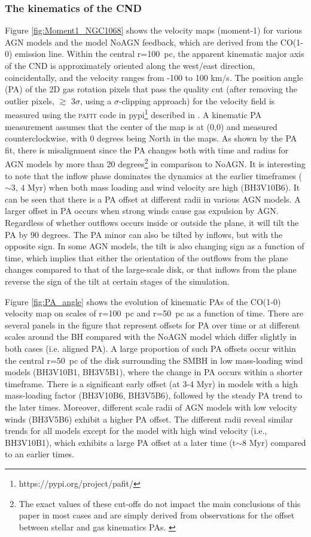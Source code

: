 \documentclass[fleqn,usenatbib]{mnras}
\begin{document}
\subsubsection{The kinematics of the CND}
Figure \ref{fig:Moment1_NGC1068} shows the velocity maps (moment-1) for various AGN models and the model NoAGN feedback, which are derived from the CO(1-0) emission line. 
Within the central r=100~pc, the apparent kinematic major axis of the CND is approximately oriented along the west/east direction, coincidentally, and the velocity ranges from -100 to 100 km/s. 
The position angle (PA) of the 2D gas rotation pixels that pass the quality cut (after removing the outlier pixels, $\gtrsim$ 3$\sigma$, using a $\sigma$-clipping approach) for the velocity field is measured using the \textsc{pafit} code in pypi\footnote{https://pypi.org/project/pafit/}  described in \cite{Krajnovic2006}. A kinematic PA measurement assumes that the center of the map is at (0,0) and measured counterclockwise, with 0 degrees being North in the maps. 
As shown by the PA fit, there is misalignment since the PA changes both with time and radius for AGN models by more than 20 degrees\footnote{The exact values of these cut-offs do not impact the main conclusions of this paper in most cases and are simply derived from observations for the offset between stellar and gas kinematics PAs. \citep[see e.g][]{Lagos2015,Bryant2019}}  in comparison to NoAGN. 
It is interesting to note that the inflow phase dominates the dynamics at the earlier timeframes ($\sim$3, 4 Myr) when both mass loading and wind velocity are high (BH3V10B6). 
It can be seen that there is a PA offset at different radii in various AGN models. A larger offset  in PA occurs when strong winds cause gas expulsion by AGN. Regardless of whether outflows occurs inside or outside the plane, it will tilt the PA by 90 degrees. The PA minor can also be tilted by inflows, but with the opposite sign.  In some AGN models, the tilt is also changing sign as a function of time, which implies that either the orientation of the outflows from the plane changes compared to that of the large-scale disk, or that inflows from the plane reverse the sign of the tilt at certain stages of the simulation.

Figure \ref{fig:PA_angle} shows the evolution of kinematic PAs of the CO(1-0) velocity map on scales of r=100~pc and r=50~pc as a function of time. There are several panels in the figure that represent offsets for PA over time or at different scales around the BH compared with the NoAGN model which differ slightly in both cases (i.e.  aligned PA).  
A large proportion of such PA offsets occur within the central r=50~pc of the disk surrounding the SMBH in low mass-loading wind models (BH3V10B1, BH3V5B1), where the change in PA occurs within a shorter timeframe. There is a significant early offset (at 3-4 Myr) in models with a high mass-loading factor (BH3V10B6, BH3V5B6), followed by the steady PA trend to the later times. Moreover, different scale radii of AGN models with low velocity winds (BH3V5B6) exhibit a higher PA offset.
The different radii reveal similar trends for all models except for the model with high wind velocity (i.e., BH3V10B1), which exhibits a large PA offset at a later time (t$\sim$8 Myr) compared to an earlier times.
\end{document}
